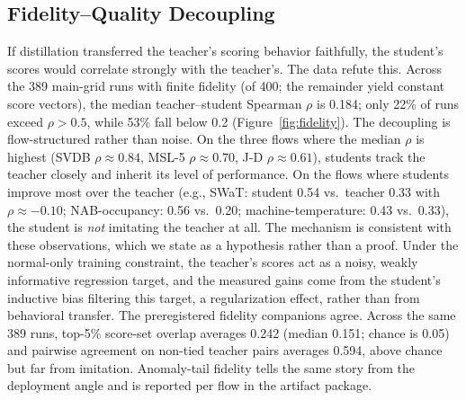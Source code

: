 

\subsection{Fidelity--Quality Decoupling}\label{sec:dev-fidelity}
If distillation transferred the teacher's scoring behavior faithfully,
the student's scores would correlate strongly with the teacher's. The data refute this. Across the 389 main-grid
runs with finite fidelity (of 400; the remainder yield constant score
vectors), the median teacher--student Spearman $\rho$ is 0.184; only 22\% of
runs exceed $\rho>0.5$, while 53\% fall below 0.2 (Figure~\ref{fig:fidelity}). The decoupling is
flow-structured rather than noise. On the three flows where the median
$\rho$ is highest (SVDB $\rho{\approx}0.84$, MSL-5 $\rho{\approx}0.70$,
J-D $\rho{\approx}0.61$), students track the teacher closely and inherit
its level of performance. On the flows where students improve most over
the teacher (e.g., SWaT: student 0.54 vs.\ teacher 0.33 with
$\rho{\approx}-0.10$; NAB-occupancy: 0.56 vs.\ 0.20; machine-temperature:
0.43 vs.\ 0.33), the student is \emph{not} imitating the teacher at all.
The mechanism is consistent with these observations, which we state as a
hypothesis rather than a proof. Under the normal-only training constraint,
the teacher's scores act as a noisy, weakly informative regression target,
and the measured gains come from the student's inductive bias filtering
this target, a regularization effect, rather than from behavioral
transfer.
The preregistered fidelity companions agree. Across the same 389 runs,
top-5\% score-set overlap averages 0.242 (median 0.151; chance
is 0.05) and pairwise agreement on non-tied teacher pairs averages
0.594, above chance but far from imitation. Anomaly-tail fidelity tells the same story from the deployment
angle and is reported per flow in the artifact package.

